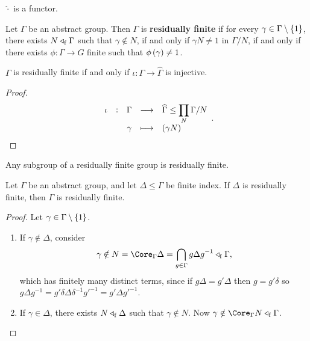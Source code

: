 \begin{corollary}
$ \widehat{\cdot} $ is a functor.
\end{corollary}

\pagebreak


\begin{definition}
Let $ \Gamma $ be an abstract group. Then $ \Gamma $ is \textbf{residually finite} if for every $ \gamma \in \Gamma \setminus \cbr{1} $, there exists $ N \triangleleft_{\mathrm{f}} \Gamma $ such that $ \gamma \notin N $, if and only if $ \gamma N \ne 1 $ in $ \Gamma / N $, if and only if there exists $ \phi : \Gamma \to G $ finite such that $ \phi\br{\gamma} \ne 1 $.
\end{definition}

\begin{proposition}
$ \Gamma $ is residually finite if and only if $ \iota : \Gamma \to \widehat{\Gamma} $ is injective.
\end{proposition}

\begin{proof}
$$ \function[\iota]{\Gamma}{\widehat{\Gamma} \le \prod_N \Gamma / N}{\gamma}{\br{\gamma N}}. $$
\end{proof}

\begin{proposition}
Any subgroup of a residually finite group is residually finite.
\end{proposition}

\begin{proposition}
Let $ \Gamma $ be an abstract group, and let $ \Delta \le \Gamma $ be finite index. If $ \Delta $ is residually finite, then $ \Gamma $ is residually finite.
\end{proposition}

\begin{proof}
Let $ \gamma \in \Gamma \setminus \cbr{1} $.
\begin{enumerate}[leftmargin=0.5in, label=Case \arabic*.]
\item If $ \gamma \notin \Delta $, consider
$$ \gamma \notin N = \Core_\Gamma \Delta = \bigcap_{g \in \Gamma} g\Delta g^{-1} \triangleleft_\f \Gamma, $$
which has finitely many distinct terms, since if $ g\Delta = g'\Delta $ then $ g = g'\delta $ so $ g\Delta g^{-1} = g'\delta\Delta\delta^{-1}g'^{-1} = g'\Delta g'^{-1} $.
\item If $ \gamma \in \Delta $, there exists $ N \triangleleft_{\mathrm{f}} \Delta $ such that $ \gamma \notin N $. Now $ \gamma \notin \Core_\Gamma N \triangleleft_\f \Gamma $.
\end{enumerate}
\end{proof}

